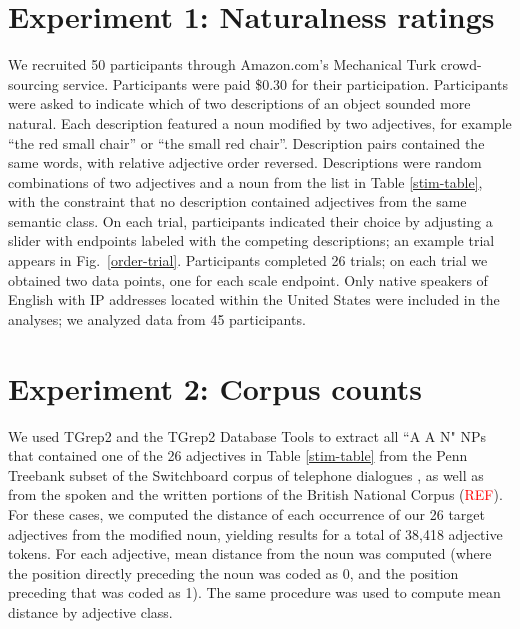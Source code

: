 \documentclass{pnastwo}
\newcommand{\tableref}[1]{Table \ref{#1}}
\newcommand{\figref}[1]{Fig.~\ref{#1}}
\newcommand{\red}[1]{\textcolor{Red}{#1}}
\begin{document}
\begin{article}
\begin{materials}
\section{Experiment 1: Naturalness ratings}	
We recruited 50 participants through Amazon.com's Mechanical Turk crowd-sourcing service. Participants were paid \$0.30 for their participation.
Participants were asked to indicate which of two descriptions of an object sounded more natural. Each description featured a noun modified by two adjectives, for example ``the red small chair'' or ``the small red chair''. Description pairs contained the same words, with relative adjective order reversed. Descriptions were random combinations of two adjectives and a noun from the list in Table \ref{stim-table}, with the constraint that no description contained adjectives from the same semantic class.
On each trial, participants indicated their choice by adjusting a slider with endpoints labeled with the competing descriptions; an example trial appears in Fig.\ \ref{order-trial}. Participants completed 26 trials; on each trial we obtained two data points, one for each scale endpoint.  Only native speakers of English with IP addresses located within the United States were included in the analyses; we analyzed data from 45 participants.

\section{Experiment 2: Corpus counts} 
We used TGrep2 \cite{rohde2005} and the TGrep2 Database Tools \cite{degenjaeger-tdt} to extract all ``A A N"  NPs that contained one of the 26 adjectives in Table \ref{stim-table} from the Penn Treebank subset of the Switchboard corpus of telephone dialogues \cite{godfrey1992}, as well as from the spoken and the written portions of the British National Corpus (\red{REF}). For these cases, we computed the distance of each occurrence of our 26 target adjectives from the modified noun, yielding results for a total of 38,418 adjective tokens.  For each adjective, mean distance from the noun was computed (where the position directly preceding the noun was coded as 0, and the position preceding that was coded as 1). The same procedure was used to compute mean distance by adjective class.


\end{materials}
\end{article}
\end{document}
